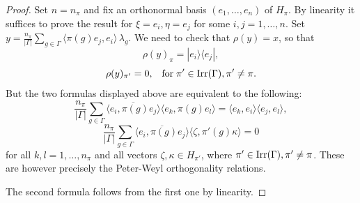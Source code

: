 \documentclass[12pt]{amsart}
\theoremstyle{definition}
\theoremstyle{definition}
\theoremstyle{definition}
\theoremstyle{definition}
\numberwithin{equation}{section}
\begin{document}
\begin{proof}
Set $n=n_\pi$ and fix an orthonormal basis $(e_1, \ldots, e_n)$ of $H_\pi$.
By linearity it suffices to prove the result for $\xi=e_i, \eta = e_j$ for some $i,j=1,\ldots,n$. Set $y=\frac{ n_\pi}{|\Gamma|}\sum_{g\in \Gamma}
\langle \pi(g) e_j,  e_i \rangle\,\lambda_g$. We need to check that $\rho(y) =x$, so that
\[ \rho(y)_\pi = |e_i\rangle \langle e_j|,\]
\[ \rho(y)_{\pi'} =0, \;\;\; \textup{for} \;\pi' \in \textup{Irr}(\Gamma), \pi'\neq \pi.\]
But the two formulas displayed above are equivalent to the following:
\[ \frac{ n_\pi}{|\Gamma|}\sum_{g \in \Gamma}
\overline{ \langle e_i,  \pi(g) e_j \rangle} \langle e_k,  \pi(g) e_l \rangle = \langle e_k, e_i \rangle \langle e_j, e_l \rangle,    \]
\[ \frac{ n_\pi}{|\Gamma|}\sum_{g\in \Gamma}
\overline{ \langle e_i,  \pi(g) e_j \rangle} \langle \zeta,  \pi'(g) \kappa \rangle = 0  \]
for all $k,l=1,\ldots,n_\pi$ and all vectors $\zeta, \kappa \in H_{\pi'}$, where $\pi' \in \textup{Irr}(\Gamma), \pi'\neq \pi$. These are however precisely the Peter-Weyl orthogonality relations.

The second formula follows from the first one by linearity.



\end{proof}
\end{document}
